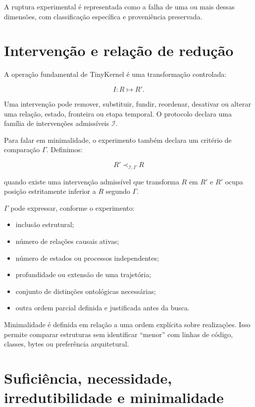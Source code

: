 \documentclass[11pt,a4paper]{article}
\begin{document}
A ruptura experimental é representada como a falha de uma ou mais dessas dimensões,
com classificação específica e proveniência preservada.

\section{Intervenção e relação de redução}

A operação fundamental de TinyKernel é uma transformação controlada:

\[
I:R\mapsto R'.
\]

Uma intervenção pode remover, substituir, fundir, reordenar, desativar ou alterar
uma relação, estado, fronteira ou etapa temporal. O protocolo declara uma família de
intervenções admissíveis $\mathcal I$.

Para falar em minimalidade, o experimento também declara um critério de comparação
$\Gamma$. Definimos:

\[
R' \prec_{\mathcal I,\Gamma} R
\]

quando existe uma intervenção admissível que transforma $R$ em $R'$ e $R'$ ocupa
posição estritamente inferior a $R$ segundo $\Gamma$.

$\Gamma$ pode expressar, conforme o experimento:

\begin{itemize}
  \item inclusão estrutural;
  \item número de relações causais ativas;
  \item número de estados ou processos independentes;
  \item profundidade ou extensão de uma trajetória;
  \item conjunto de distinções ontológicas necessárias;
  \item outra ordem parcial definida e justificada antes da busca.
\end{itemize}

\begin{thesisbox}
Minimalidade é definida em relação a uma ordem explícita sobre realizações. Isso
permite comparar estruturas sem identificar ``menor'' com linhas de código, classes,
bytes ou preferência arquitetural.
\end{thesisbox}

\section{Suficiência, necessidade, irredutibilidade e minimalidade}
\end{document}
